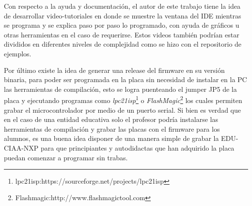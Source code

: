 Con respecto a la ayuda y documentación, el autor de este trabajo tiene la idea de desarrollar video-tutoriales en donde se muestre la ventana del IDE mientras se programa y se explica paso por paso lo programado, con ayuda de gráficos u otras herramientas en el caso de requerirse. Estos videos también podrían estar divididos en diferentes niveles de complejidad como se hizo con el repositorio de ejemplos.

Por último existe la idea de generar una release del firmware en su versión binaria, para poder ser programada en la placa sin necesidad de instalar en la PC las herramientas de compilación, esto se logra puenteando el jumper JP5 de la placa y ejecutando programas como \textit{lpc21isp}\footnote{lpc21isp:https://sourceforge.net/projects/lpc21isp} o \textit{FlashMagic}\footnote{Flashmagic:http://www.flashmagictool.com} los cuales permiten grabar el microcontrolador por medio de un puerto serial. Si bien es verdad que en el caso de una entidad educativa solo el profesor podría instalarse las herramientas de compilación y grabar las placas con el firmware para los alumnos, es una buena idea disponer de una manera simple de grabar la EDU-CIAA-NXP para que principiantes y autodidactas que han adquirido la placa puedan comenzar a programar sin trabas.


 



